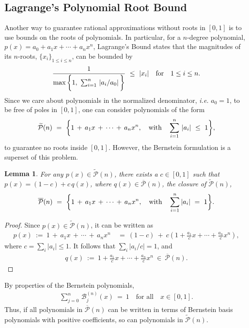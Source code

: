 \documentclass{article}
\newtheorem{lemma}{Lemma}
\begin{document}
\subsection{Lagrange's Polynomial Root Bound}
Another way to guarantee rational approximations without roots in $[0, 1]$ is to use bounds on the roots of polynomials. In particular, for a $n$-degree polynomial, $p(x)=a_0 + a_1x + \cdots + a_n x^n$, Lagrange's Bound states that the magnitudes of its $n$-roots, $\{x_i\}_{1\leq i\leq n}$, can be bounded by
\begin{eqnarray}
    \frac{1}{\max\bigg{\{} 1,\ \sum_{i=1}^n\, \left|{a_i}/{a_0}\right|\bigg{\}}}\ \leq\ |x_i| \quad \text{for}\quad 1\leq i\leq n.
\end{eqnarray}
Since we care about polynomials in the normalized denominator, \textit{i.e.} $a_0=1$, to be free of poles in $[0, 1]$, one can consider polynomials of the form
\begin{eqnarray}\label{eq:lagrange_polynomial}
\widetilde{\mathcal{P}}(n)\ =\ \bigg{\{}1\, +\, a_1x\, +\, \cdots\, +\, a_n x^n, \quad\text{with}\quad \sum_{i=1}^n\,|a_i|\ \leq \ 1\bigg{\}},
\end{eqnarray}
to guarantee no roots inside $[0, 1]$. However, the Bernstein formulation is a superset of this problem. 
{
\begin{lemma}
    For any $p(x)\in \widetilde{\mathcal{P}}(n)$, there exists a $c\in[0,1]$ such that $p(x) = (1 - c) + c\, q(x)$, where $q(x)\in\overline{\mathcal{P}}(n)$, the closure of $\widetilde{\mathcal{P}}(n)$,
    \begin{eqnarray}
    \overline{\mathcal{P}}(n)\ =\ \bigg{\{}1\, +\, a_1x\, +\, \cdots\, +\, a_n x^n, \quad\text{with}\quad \sum_{i=1}^n|a_i|\ =\ 1\bigg{\}}.
\end{eqnarray}
\end{lemma}
}
\begin{proof}
Since $p(x)\in\widetilde{\mathcal{P}}(n)$, it can be written as
\begin{align}
    p(x)\ :=\ 1\, +\, a_1x\, +\, \cdots\, +\, a_n x^n\ &=\ (1-c)\ +\ c\left(1 + \frac{a_1}{c}x +\cdots + \frac{a_n}{c}x^n\right),
\end{align}
where $c=\sum_i|a_i|\leq 1$. It follows that $\sum_i|a_i/c| = 1$, and
\begin{align}
    q(x)\ :=\ 1 + \frac{a_1}{c}x +\cdots + \frac{a_n}{c}x^n\ \in\ \overline{\mathcal{P}}(n).
\end{align}
\end{proof}
{
By properties of the Bernstein polynomials,
\begin{align}
    \sum_{j=0}^n\, \mathcal{B}^{(n)}_j(x)\ =\ 1\quad\text{for all}\quad x\in[0, 1].
\end{align}
Thus, if all polynomials in $\overline{\mathcal{P}}(n)$ can be written in terms of Bernstein basis polynomials with positive coefficients, so can polynomials in $\widetilde{\mathcal{P}}(n)$.}
\end{document}
